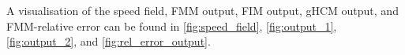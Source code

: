 \documentclass[11pt]{article}       %
\begin{document}
A visualisation of the speed field, FMM output, FIM output, gHCM output, and FMM-relative error can be found in \autoref{fig:speed_field}, \autoref{fig:output_1}, \autoref{fig:output_2}, and \autoref{fig:rel_error_output}.

\end{document}
